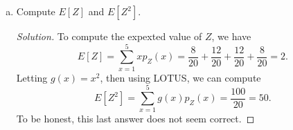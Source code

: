 \documentclass[12pt]{article}
\newenvironment{solution}
{\renewcommand\qedsymbol{$\blacksquare$}\begin{proof}[Solution]}
{\end{proof}}
\begin{document}
\begin{enumerate}
\begin{enumerate}[(a)]
\begin{solution}
                        that are bigger than $x$ in the set $\{1, 2, 3, 4,
                        5\}$. Thus 
                        \begin{equation*}
                            p_Z(x)=\begin{cases}
                                \frac{2(5-x)}{20} &\text{if $x\in\{1, 2, 3, 4\}$} \\
                                0 &\text{otherwise}.
                            \end{cases}
                        \end{equation*}
                    \end{solution}
                \item Compute $E[Z]$ and $E[Z^2]$.
                    \begin{solution}
                        To compute the expexted value of $Z$, we have 
                        \begin{equation*}
                            E[Z]=\sum_{x=1}^{5}xp_Z(x)
                            =\frac{8}{20}+\frac{12}{20}+\frac{12}{20}+\frac{8}{20}=
                            2.
                        \end{equation*}
                        Letting $g(x)=x^2$, then using LOTUS, we can compute
                        \begin{equation*}
                            E[Z^2]=\sum_{x=1}^{5}g(x)p_Z(x)=\frac{100}{20}=50.
                        \end{equation*}
                        To be honest, this last answer does not seem correct. 
                    \end{solution}
            \end{enumerate}
    \end{enumerate}
\end{document}
